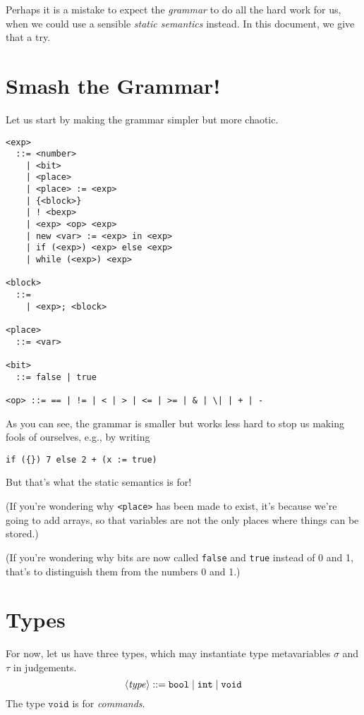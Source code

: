 \documentclass{article}
\begin{document}
Perhaps it is a mistake to expect the \emph{grammar} to do all the hard work for us, when we could use a sensible \emph{static semantics} instead. In this document, we give that a try.


\section{Smash the Grammar!}

Let us start by making the grammar simpler but more chaotic.

\begin{verbatim}
<exp>
  ::= <number>
    | <bit>
    | <place>
    | <place> := <exp>
    | {<block>}
    | ! <bexp>
    | <exp> <op> <exp>
    | new <var> := <exp> in <exp>
    | if (<exp>) <exp> else <exp>
    | while (<exp>) <exp>

<block>
  ::=
    | <exp>; <block>

<place>
  ::= <var>

<bit>
  ::= false | true

<op> ::= == | != | < | > | <= | >= | & | \| | + | -
\end{verbatim}

As you can see, the grammar is smaller but works less hard to stop us making fools of ourselves, e.g., by writing

\begin{verbatim}
if ({}) 7 else 2 + (x := true)
\end{verbatim}

But that's what the static semantics is for!

(If you're wondering why {\tt <place>} has been made to exist, it's because we're going to add arrays, so that variables are not the only places where things can be stored.)

(If you're wondering why bits are now called {\tt false} and {\tt true} instead
of 0 and 1, that's to distinguish them from the numbers 0 and 1.)


\section{Types}

\newcommand{\bool}{\mathtt{bool}}
\newcommand{\intg}{\mathtt{int}}
\newcommand{\void}{\mathtt{void}}
\newcommand{\es}{\mathit{es}}
\newcommand{\false}{\mathtt{false}}
\newcommand{\true}{\mathtt{true}}
\newcommand{\JPl}[3]{#1 \vdash #2 \leftarrow #3} 
\newcommand{\JBl}[4]{#1 \vdash #2 | #3 : #4} 
\newcommand{\JEx}[3]{#1 \vdash #2 : #3} 
For now, let us have three types, which may instantiate type
metavariables $\sigma$ and $\tau$ in judgements.
\[
  \NT{type} ::= \bool \;|\; \intg \;|\; \void
\]
The type $\void$ is for \emph{commands}.
\end{document}
